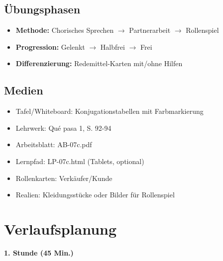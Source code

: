 \documentclass[11pt,a4paper]{article}
\newcommand{\lehrwerk}{Qué pasa 1}
\newcommand{\lehrwerkseite}{S. 92-94}
\begin{document}
\subsection{Übungsphasen}
\begin{itemize}
    \item \textbf{Methode:} Chorisches Sprechen $\rightarrow$ Partnerarbeit $\rightarrow$ Rollenspiel
    \item \textbf{Progression:} Gelenkt $\rightarrow$ Halbfrei $\rightarrow$ Frei
    \item \textbf{Differenzierung:} Redemittel-Karten mit/ohne Hilfen
\end{itemize}

\subsection{Medien}
\begin{itemize}
    \item Tafel/Whiteboard: Konjugationstabellen mit Farbmarkierung
    \item Lehrwerk: \lehrwerk, \lehrwerkseite
    \item Arbeitsblatt: AB-07c.pdf
    \item Lernpfad: LP-07c.html (Tablets, optional)
    \item Rollenkarten: Verkäufer/Kunde
    \item Realien: Kleidungsstücke oder Bilder für Rollenspiel
\end{itemize}

\section{Verlaufsplanung}

\textbf{1. Stunde (45 Min.)}
\end{document}
